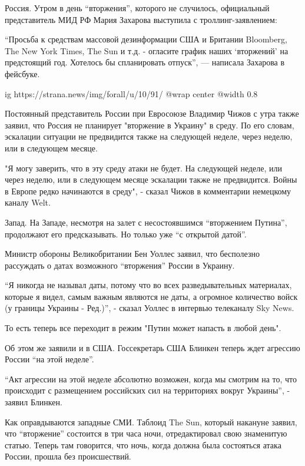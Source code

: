 Россия. Утром в день \enquote{вторжения}, которого не случилось, официальный
представитель МИД РФ Мария Захарова выступила с троллинг-заявлением:

\enquote{Просьба к средствам массовой дезинформации США и Британии Bloomberg, The New
York Times, The Sun и т.д. - огласите график наших \enquote{вторжений} на предстоящий
год. Хотелось бы спланировать отпуск}, — написала Захарова в фейсбуке. 

\ifcmt
  ig https://strana.news/img/forall/u/10/91/%
  @wrap center
  @width 0.8
\fi

Постоянный представитель России при Евросоюзе Владимир Чижов с утра также
заявил, что Россия не планирует "вторжение в Украину" в среду. По его словам,
эскалации ситуации не предвидится также на следующей неделе, через неделю, или
в следующем месяце.

"Я могу заверить, что в эту среду атаки не будет. На следующей неделе, или
через неделю, или в следующем месяце эскалации также не предвидится. Войны в
Европе редко начинаются в среду", - сказал Чижов в комментарии немецкому каналу
Welt.

Запад. На Западе, несмотря на залет с несостоявшимся \enquote{вторжением Путина},
продолжают его предсказывать. Но только уже \enquote{с открытой датой}.

Министр обороны Великобритании Бен Уоллес заявил, что бесполезно рассуждать о
датах возможного \enquote{вторжения} России в Украину.

\enquote{Я никогда не называл даты, потому что во всех разведывательных материалах,
которые я видел, самым важным являются не даты, а огромное количество войск (у
границы Украины - Ред.)}, - сказал Уоллес в интервью телеканалу Sky News.

То есть теперь все переходит в режим "Путин может напасть в любой день".

Об этом же заявили и в США. Госсекретарь США Блинкен теперь ждет агрессию
России \enquote{на этой неделе}.
 
\enquote{Акт агрессии на этой неделе абсолютно возможен, когда мы смотрим на то, что
происходит с размещением российских сил на территориях вокруг Украины}, -
заявил Блинкен.

Как оправдываются западные СМИ. Таблоид The Sun, который накануне заявил, что
\enquote{вторжение} состоится в три часа ночи, отредактировал свою знаменитую статью.
Теперь там говорится, что ночь, когда должна была состояться атака России,
прошла без происшествий.

